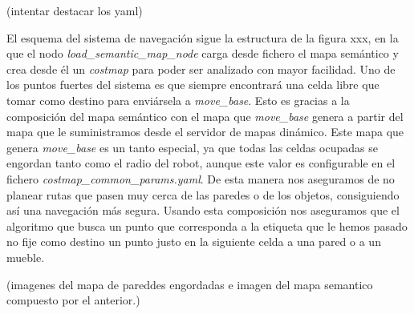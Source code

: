 (intentar destacar los yaml)

El esquema del sistema de navegación sigue la estructura de la figura xxx, en la que el nodo \textit{load\_semantic\_map\_node} carga desde fichero el mapa semántico y crea desde él un \textit{costmap} para poder ser analizado con mayor facilidad. 
Uno de los puntos fuertes del sistema es que siempre encontrará una celda libre que tomar como destino para enviársela a 
\textit{move\_base}. Esto es gracias a la composición del mapa semántico con el mapa que \textit{move\_base} genera a partir del mapa que le suministramos desde el servidor de mapas dinámico. Este mapa que genera \textit{move\_base} es un tanto especial, ya que todas las celdas ocupadas se engordan tanto como el radio del robot, aunque este valor es configurable en el fichero \textit{costmap\_common\_params.yaml}. De esta manera nos aseguramos de no planear rutas que pasen muy cerca de las paredes o de los objetos, consiguiendo así una navegación más segura. 
Usando esta composición nos aseguramos que el algoritmo que busca un punto que corresponda a la etiqueta que le hemos pasado no fije como destino un punto justo en la siguiente celda a una pared o a un mueble.

(imagenes del mapa de pareddes engordadas e imagen del mapa semantico compuesto por el anterior.)

